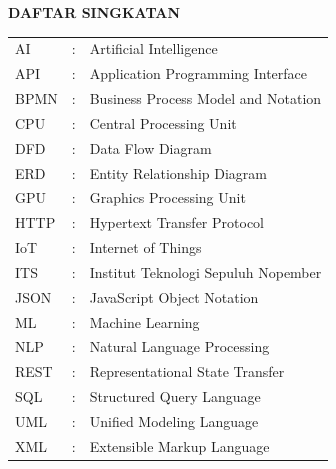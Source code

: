 
\begin{center}
    {\fontsize{14}{16}\selectfont\bfseries DAFTAR SINGKATAN}
\end{center}

\vspace{0.5\baselineskip}


\noindent
\begin{tabular}{@{}p{2cm}cp{10cm}@{}}
    AI & : & Artificial Intelligence \\[0.3cm]
    API & : & Application Programming Interface \\[0.3cm]
    BPMN & : & Business Process Model and Notation \\[0.3cm]
    CPU & : & Central Processing Unit \\[0.3cm]
    DFD & : & Data Flow Diagram \\[0.3cm]
    ERD & : & Entity Relationship Diagram \\[0.3cm]
    GPU & : & Graphics Processing Unit \\[0.3cm]
    HTTP & : & Hypertext Transfer Protocol \\[0.3cm]
    IoT & : & Internet of Things \\[0.3cm]
    ITS & : & Institut Teknologi Sepuluh Nopember \\[0.3cm]
    JSON & : & JavaScript Object Notation \\[0.3cm]
    ML & : & Machine Learning \\[0.3cm]
    NLP & : & Natural Language Processing \\[0.3cm]
    REST & : & Representational State Transfer \\[0.3cm]
    SQL & : & Structured Query Language \\[0.3cm]
    UML & : & Unified Modeling Language \\[0.3cm]
    XML & : & Extensible Markup Language \\[0.3cm]
\end{tabular}